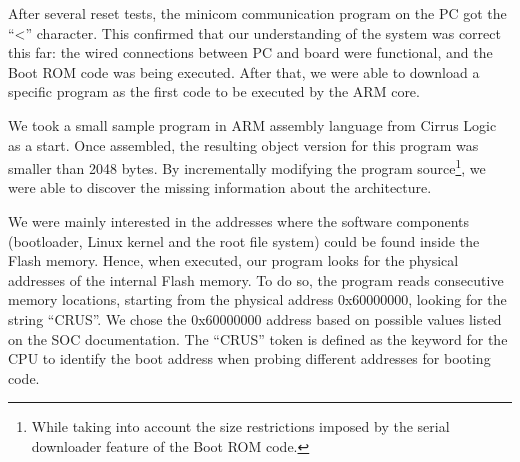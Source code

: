 \documentclass[conference]{IEEEtran}
\newcommand{\revisar}[1]{}
\newcommand{\nota}[1]{}
\begin{document}
\nota{En nuestras pruebas logramos obtener 
el caracter ``\textgreater'' desde el programa de comunicación minicom,
por lo que pudimos confirmar varias hipótesis. En principio
toda la conexión física entre la placa ENTC-1000 y nuestra PC era funcional.
También a nivel de comunicación vía software.}

After several reset tests, the minicom communication program on the PC got the ``\textless'' character. This confirmed that our understanding of the system was correct this far: the wired connections between PC and board were functional, and the Boot ROM code was being executed. After that, we were able to download a specific program as the first code to be executed by the ARM core.


\nota{Posteriormente, preparamos un pequeño programa en lenguaje ensamblador que no supere
los 2048 bytes, y que nos permita ejecutar instrucciones en la CPU del 
ENTC-1000. Tomamos como base un ejemplo publicado por Cirrus, y lo modificamos
para realizar las pruebas con respecto a la información que
nos faltaba por conocer.}

We took a small sample program in ARM assembly language from Cirrus Logic as a start. Once assembled, the resulting object version for this program was smaller than 2048 bytes. By incrementally modifying the program source\footnote{While taking into account the size restrictions imposed by the serial downloader feature of the Boot ROM code.}, we were able to discover the missing information about the architecture. \revisar{, and
it fits the size restrictions imposed by the the serial downloader feature
of the Boot ROM code.} 

\nota{En particular, hicimos que nuestro pequeño programa encontrara
la dirección física de la memoria Flash interna.
El interés por encontrar esta dirección
base, es porque en esta memoria residen los componentes de software: 
gestor de arranque, el kernel Linux, y el sistemas de archivos raíz.}

We were mainly interested in the addresses where the software components
(bootloader, Linux kernel and the root file system) could be found inside the
Flash memory. Hence, when executed, our program looks for the physical 
addresses of the internal Flash memory. To do so, the program reads consecutive
memory locations, starting from the physical address  0x60000000, looking for the string ``CRUS''.
We chose the 0x60000000 address based on possible values listed on the SOC documentation.
The ``CRUS'' token is defined as the keyword for the CPU to identify 
the boot address when probing different addresses for booting code.
\end{document}
